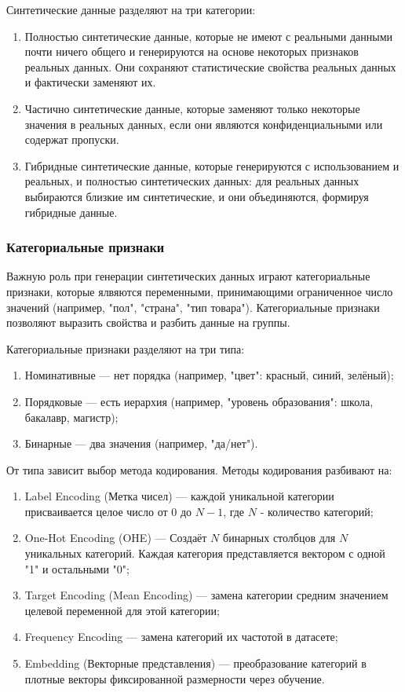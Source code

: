 Синтетические данные разделяют на три категории:
\begin{enumerate}
	\item Полностью синтетические данные, которые не имеют с реальными
	данными почти ничего общего и генерируются на основе некоторых признаков
	реальных данных. Они сохраняют статистические свойства реальных данных и
	фактически заменяют их.
	\item Частично синтетические данные, которые заменяют только
	некоторые значения в реальных данных, если они являются конфиденциальными
	или содержат пропуски.
	\item Гибридные синтетические данные, которые генерируются с
	использованием и реальных, и полностью синтетических данных: для реальных
	данных выбираются близкие им синтетические, и они объединяются, формируя
	гибридные данные.
\end{enumerate}

\subsubsection{Категориальные признаки}

Важную роль при генерации синтетических данных играют категориальные признаки, которые ялвяются переменными, принимающими ограниченное число значений (например, "пол", "страна", "тип товара").
Категориальные признаки позволяют выразить свойства и разбить данные на группы.


Категориальные признаки разделяют на три типа:
\begin{enumerate}[label*=---]
	\item Номинативные --- нет порядка (например, "цвет": красный, синий, зелёный);
	\item Порядковые --- есть иерархия (например, "уровень образования": школа, бакалавр, магистр);
	\item Бинарные --- два значения (например, "да/нет").
\end{enumerate}

От типа зависит выбор метода кодирования.
Методы кодирования разбивают на:
\begin{enumerate}[label*=---]
	\item  Label Encoding (Метка чисел) --- каждой уникальной категории присваивается целое число от 0 до $N-1$, где $N$ - количество категорий;
	\item One-Hot Encoding (OHE) --- Создаёт $N$ бинарных столбцов для $N$ уникальных категорий. Каждая категория представляется вектором с одной "1" и остальными "0";
	\item Target Encoding (Mean Encoding) --- замена категории средним значением целевой переменной для этой категории;
	\item Frequency Encoding --- замена категорий их частотой в датасете;
	\item Embedding (Векторные представления) --- преобразование категорий в плотные векторы фиксированной размерности через обучение.
\end{enumerate}

